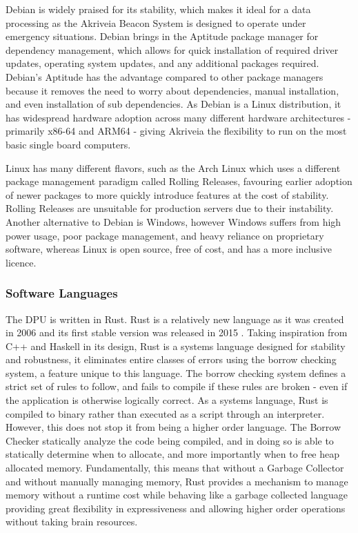 \bigskip
Debian is widely praised for its stability, which makes it ideal for a data processing as the Akriveia Beacon System is designed to operate under emergency situations. Debian brings in the \Gls{Aptitude} package manager for dependency management, which allows for quick installation of required driver updates, operating system updates, and any additional packages required.
Debian's Aptitude has the advantage compared to other package managers because it removes the need to worry about dependencies, manual installation, and even installation of sub dependencies.
As Debian is a Linux distribution, it has widespread hardware adoption across many different hardware architectures - primarily \Gls{x86-64} and \Gls{ARM64} - giving Akriveia the flexibility to run on the most basic single board computers.

\bigskip
Linux has many different flavors, such as the Arch Linux which uses a different package management paradigm called \Gls{Rolling Releases}, favouring earlier adoption of newer packages to more quickly introduce features at the cost of stability.
\Gls{Rolling Releases} are unsuitable for production servers due to their instability.
Another alternative to Debian is Windows, however Windows suffers from high power usage, poor package management, and heavy reliance on proprietary software, whereas Linux is open source, free of cost, and has a more inclusive licence.

\pagebreak
\subsubsection{Software Languages}
\medskip
The DPU is written in \Gls{Rust}.
Rust is a relatively new language as it was created in 2006 \cite{rust_graydon_interview} and its first stable version was released in 2015 \cite{rust_releases}.
Taking inspiration from C++ and Haskell in its design,
Rust is a systems language designed for stability and robustness, it eliminates entire classes of errors using the borrow checking system, a feature unique to this language.
The borrow checking system defines a strict set of rules to follow, and fails to compile if these rules are broken - even if the application is otherwise logically correct.
As a systems language, Rust is compiled to binary rather than executed as a script through an interpreter. However, this does not stop it from being a higher order language.
The \Gls{Borrow Checker} statically analyze the code being compiled, and in doing so is able to statically determine when to allocate, and more importantly when to free heap allocated memory.
Fundamentally, this means that without a \Gls{Garbage Collector} and without manually managing memory, Rust provides a mechanism to manage memory without a runtime cost while behaving like a garbage collected language providing great flexibility in expressiveness and allowing higher order operations without taking brain resources.

